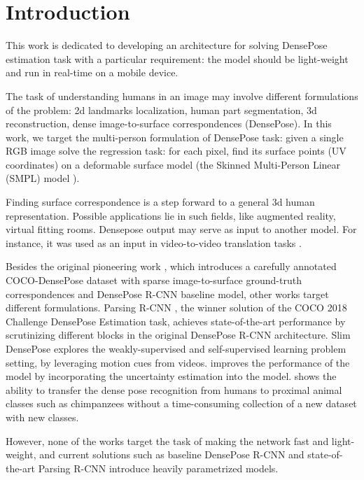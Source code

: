 \section{Introduction}

This work is dedicated to developing an architecture for solving DensePose \cite{densepose} estimation task with a particular requirement: the model should be light-weight and run in real-time on a mobile device.

The task of understanding humans in an image may involve different formulations of the problem: 2d landmarks localization, human part segmentation, 3d reconstruction, dense image-to-surface correspondences (DensePose). In this work, we target the multi-person formulation of DensePose task: given a single RGB image solve the regression task: for each pixel, find its surface points (UV coordinates) on a deformable surface model (the Skinned Multi-Person Linear (SMPL) model \cite{smpl}).

Finding surface correspondence is a step forward to a general 3d human representation. Possible applications lie in such fields, like augmented reality, virtual fitting rooms. Densepose output may serve as input to another model. For instance, it was used as an input in video-to-video translation tasks \cite{vid2vid}.

Besides the original pioneering work \cite{densepose}, which introduces a carefully annotated COCO-DensePose dataset with sparse image-to-surface ground-truth correspondences and DensePose R-CNN baseline model, other works target different formulations. Parsing R-CNN \cite{parsing}, the winner solution of the COCO 2018 Challenge DensePose Estimation task, achieves state-of-the-art performance by scrutinizing different blocks in the original DensePose R-CNN architecture. Slim DensePose \cite{denseposeslim} explores the weakly-supervised and self-supervised learning problem setting, by leveraging motion cues from videos. \cite{uncertainty} improves the performance of the model by incorporating the uncertainty estimation into the model. \cite{monkeys} shows the ability to transfer the dense pose recognition from humans to proximal animal classes such as chimpanzees without a time-consuming collection of a new dataset with new classes.

However, none of the works target the task of making the network fast and light-weight, and current solutions such as baseline DensePose R-CNN and state-of-the-art Parsing R-CNN introduce heavily parametrized models.

